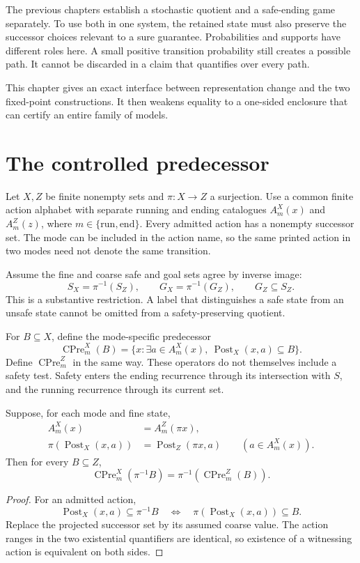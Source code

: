 The previous chapters establish a stochastic quotient and a safe-ending game separately. To use both in one system, the retained state must also preserve the successor choices relevant to a sure guarantee. Probabilities and supports have different roles here. A small positive transition probability still creates a possible path. It cannot be discarded in a claim that quantifies over every path.

This chapter gives an exact interface between representation change and the two fixed-point constructions. It then weakens equality to a one-sided enclosure that can certify an entire family of models.

\section{The controlled predecessor}
Let $X,Z$ be finite nonempty sets and $\pi:X\to Z$ a surjection. Use a common finite action alphabet with separate running and ending catalogues $A^X_m(x)$ and $A^Z_m(z)$, where $m\in\{\mathrm{run},\mathrm{end}\}$. Every admitted action has a nonempty successor set. The mode can be included in the action name, so the same printed action in two modes need not denote the same transition.

Assume the fine and coarse safe and goal sets agree by inverse image:
\[
 S_X=\pi^{-1}(S_Z),\qquad G_X=\pi^{-1}(G_Z),\qquad G_Z\subseteq S_Z.
\]
This is a substantive restriction. A label that distinguishes a safe state from an unsafe state cannot be omitted from a safety-preserving quotient.

For $B\subseteq X$, define the mode-specific predecessor
\[
 \operatorname{CPre}^X_m(B)
 =\{x:\exists a\in A^X_m(x),\ \operatorname{Post}_X(x,a)\subseteq B\}.
\]
Define $\operatorname{CPre}^Z_m$ in the same way. These operators do not themselves include a safety test. Safety enters the ending recurrence through its intersection with $S$, and the running recurrence through its current set.

\begin{Corelemma}\label{Core:r:control-predecessor}
Suppose, for each mode and fine state,
\begin{align*}
 A^X_m(x)&=A^Z_m(\pi x),\\
 \pi(\operatorname{Post}_X(x,a))&=\operatorname{Post}_Z(\pi x,a)
 \qquad(a\in A^X_m(x)).
\end{align*}
Then for every $B\subseteq Z$,
\[
 \operatorname{CPre}^X_m(\pi^{-1}B)
 =\pi^{-1}(\operatorname{CPre}^Z_m(B)).
\]
\end{Corelemma}
\begin{proof}
For an admitted action,
\[
 \operatorname{Post}_X(x,a)\subseteq\pi^{-1}B
 \quad\Longleftrightarrow\quad
 \pi(\operatorname{Post}_X(x,a))\subseteq B.
\]
Replace the projected successor set by its assumed coarse value. The action ranges in the two existential quantifiers are identical, so existence of a witnessing action is equivalent on both sides.
\end{proof}

